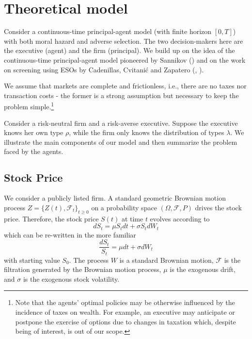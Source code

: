 \section{Theoretical model}
Consider a continuous-time principal-agent model (with finite horizon $[0, T]$) with both moral hazard and adverse selection. The two decision-makers here are the executive (agent) and the firm (principal).
We build up on the idea of the continuous-time principal-agent model pioneered by Sannikov (\cite{sannikov2008continuous}) and on the work on screening using ESOs by Cadenillas, Cvitanić and Zapatero (\cite{cadenillas2002executive}, \cite{cadenillas2005executive}).

We assume that markets are complete and frictionless, i.e., there are no taxes nor transaction costs - the former is a strong assumption but necessary to keep the problem simple.\footnote{Note that the agents' optimal policies may be otherwise influenced by the incidence of taxes on wealth. For example, an executive may anticipate or postpone the exercise of options due to changes in taxation which, despite being of interest, is out of our scope.}

Consider a risk-neutral firm and a risk-averse executive. Suppose the executive knows her own type $\rho$, while the firm only knows the distribution of types $\lambda$. We illustrate the main components of our model and then summarize the problem faced by the agents.


\subsection{Stock Price}
We consider a publicly listed firm. A standard geometric Brownian motion process $Z = \{ Z(t), \mathscr{F}_t \}_{t \ge 0}$ on a probability space $(\Omega, \mathscr{F}, P)$ drives the stock price. 
Therefore, the stock price $S(t)$ at time $t$ evolves according to 
$$ dS_t = \mu S_t dt + \sigma S_t dW_t $$
which can be re-written in the more familiar
$$ \frac{dS_t}{S_t} = \mu dt + \sigma dW_t $$
with starting value $S_0$. The process $W$ is a standard Brownian motion, $\mathscr{F}$ is the filtration generated by the Brownian motion process, $\mu$ is the exogenous drift, and $\sigma$ is the exogenous stock volatility. 

